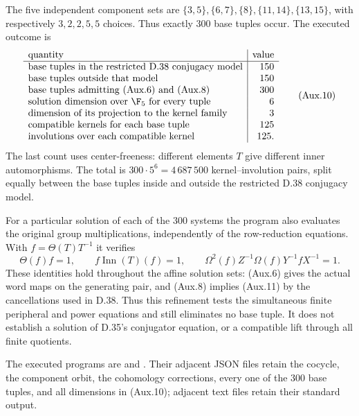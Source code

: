 The five independent component sets are
$\{3,5\},\{6,7\},\{8\},\{11,14\},\{13,15\}$,
with respectively $3,2,2,5,5$ choices.  Thus exactly
$300$ base tuples occur.  The executed outcome is
\[
 \begin{array}{l|r}
 \text{quantity}&\text{value}\\ \hline
 \text{base tuples in the restricted D.38 conjugacy model}&150\\
 \text{base tuples outside that model}&150\\
 \text{base tuples admitting (Aux.6) and (Aux.8)}&300\\
 \text{solution dimension over }\F_5\text{ for every tuple}&6\\
 \text{dimension of its projection to the kernel family}&3\\
 \text{compatible kernels for each base tuple}&125\\
 \text{involutions over each compatible kernel}&125.
 \end{array}                                           \tag{Aux.10}
\]
The last count uses center-freeness: different elements $T$
give different inner automorphisms.  The total is
$300\cdot5^6=4\,687\,500$ kernel--involution pairs,
split equally between the base tuples inside and outside
the restricted D.38 conjugacy model.

For a particular solution of each of the $300$ systems the
program also evaluates the original group multiplications,
independently of the row-reduction equations.  With
$f=\Theta(T)T^{-1}$ it verifies
\[
 \Theta(f)f=1,\qquad f\operatorname{Inn}(T)(f)=1,
 \qquad
 \Omega^2(f)Z^{-1}\Omega(f)Y^{-1}fX^{-1}=1.              \tag{Aux.11}
\]
These identities hold throughout the affine solution sets:
(Aux.6) gives the actual word maps on the generating pair,
and (Aux.8) implies (Aux.11) by the cancellations used in
D.38.  Thus this refinement tests the simultaneous finite
peripheral and power equations and still eliminates no base
tuple.  It does not establish a solution of D.35's conjugator
equation, or a compatible lift through all finite quotients.

The executed programs are
 and
.
Their adjacent JSON files retain the cocycle, the component
orbit, the cohomology corrections, every one of the $300$
base tuples, and all dimensions in (Aux.10); adjacent text
files retain their standard output.
